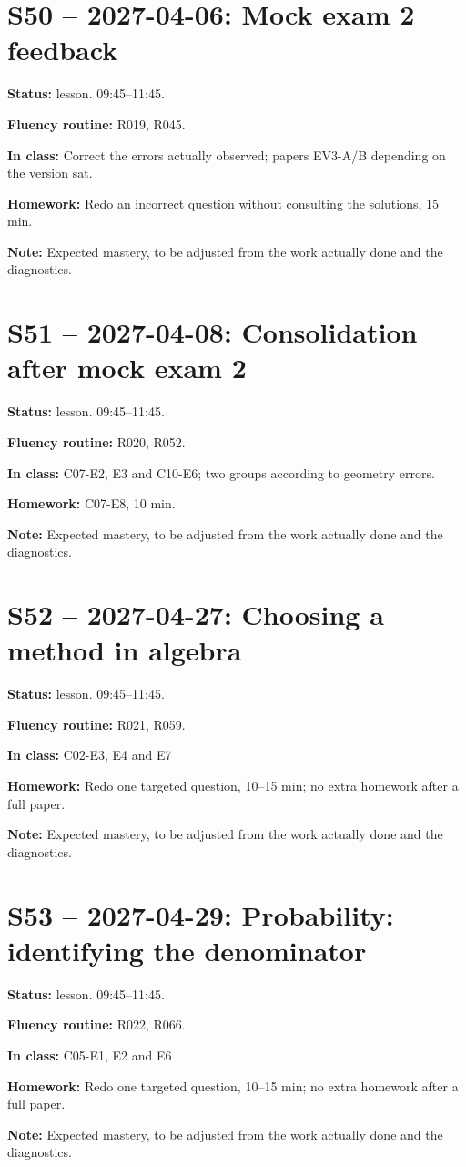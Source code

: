 \section*{S50 -- 2027-04-06: Mock exam 2 feedback}
\textbf{Status:} lesson. 09:45–11:45.\par\textbf{Fluency routine:} R019, R045.\par\textbf{In class:} Correct the errors actually observed; papers EV3-A/B depending on the version sat.\par\textbf{Homework:} Redo an incorrect question without consulting the solutions, 15 min.\par\textbf{Note:} Expected mastery, to be adjusted from the work actually done and the diagnostics.
\section*{S51 -- 2027-04-08: Consolidation after mock exam 2}
\textbf{Status:} lesson. 09:45–11:45.\par\textbf{Fluency routine:} R020, R052.\par\textbf{In class:} C07-E2, E3 and C10-E6; two groups according to geometry errors.\par\textbf{Homework:} C07-E8, 10 min.\par\textbf{Note:} Expected mastery, to be adjusted from the work actually done and the diagnostics.
\section*{S52 -- 2027-04-27: Choosing a method in algebra}
\textbf{Status:} lesson. 09:45–11:45.\par\textbf{Fluency routine:} R021, R059.\par\textbf{In class:} C02-E3, E4 and E7\par\textbf{Homework:} Redo one targeted question, 10–15 min; no extra homework after a full paper.\par\textbf{Note:} Expected mastery, to be adjusted from the work actually done and the diagnostics.
\section*{S53 -- 2027-04-29: Probability: identifying the denominator}
\textbf{Status:} lesson. 09:45–11:45.\par\textbf{Fluency routine:} R022, R066.\par\textbf{In class:} C05-E1, E2 and E6\par\textbf{Homework:} Redo one targeted question, 10–15 min; no extra homework after a full paper.\par\textbf{Note:} Expected mastery, to be adjusted from the work actually done and the diagnostics.

